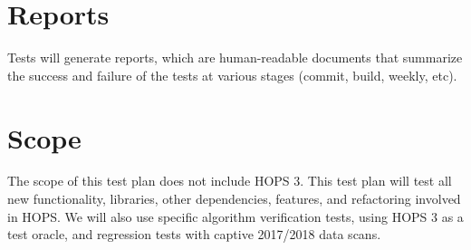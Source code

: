 \documentclass[notitlepage,letterpaper,pdftex,12pt,final]{article}
\numberwithin{equation}{section}
\begin{document}
\section{Reports}
\label{sec:reports}
Tests will generate reports, which are human-readable documents that 
summarize the success and failure of the tests at various stages
(commit, build, weekly, etc). 


\section{Scope}
\label{sec:scope}
The scope of this test plan does not include \ac{HOPS} 3. This test plan will test
all new functionality, libraries, other dependencies, features, and refactoring involved in
\ac{HOPS}. We will also use specific algorithm verification tests, using \ac{HOPS} 3 as a test
oracle, and regression tests with captive 2017/2018 data scans.





















\addtocounter{section}{1}
\renewcommand{\refname}{\thesection. References}
\printbibliography
\label{sec:references}


\label{page:LastPage}
\end{document}
